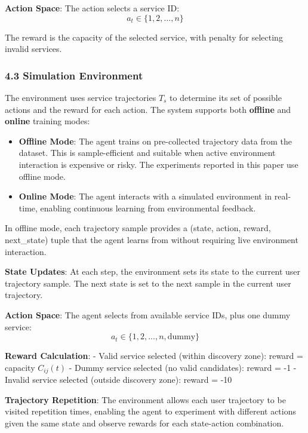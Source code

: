\documentclass[
  10pt,
  twocolumn,
]{article}
\begin{document}
\textbf{Action Space}: The action selects a service ID:
\[a_t \in \{1, 2, ..., n\}\]

The reward is the capacity of the selected service, with penalty for
selecting invalid services.

\hypertarget{simulation-environment}{%
	\subsubsection{4.3 Simulation
		Environment}\label{simulation-environment}}

The environment uses service trajectories \(T_s\) to determine its set
of possible actions and the reward for each action. The system supports
both \textbf{offline} and \textbf{online} training modes:

\begin{itemize}
	\item
	      \textbf{Offline Mode}: The agent trains on pre-collected trajectory
	      data from the dataset. This is sample-efficient and suitable when
	      active environment interaction is expensive or risky. The experiments
	      reported in this paper use offline mode.
	\item
	      \textbf{Online Mode}: The agent interacts with a simulated environment
	      in real-time, enabling continuous learning from environmental
	      feedback.
\end{itemize}

In offline mode, each trajectory sample provides a (state, action,
reward, next\_state) tuple that the agent learns from without requiring
live environment interaction.

\textbf{State Updates}: At each step, the environment sets its state to
the current user trajectory sample. The next state is set to the next
sample in the current user trajectory.

\textbf{Action Space}: The agent selects from available service IDs,
plus one dummy service: \[a_t \in \{1, 2, ..., n, \text{dummy}\}\]

\textbf{Reward Calculation}: - Valid service selected (within discovery
zone): reward = capacity \(C_{ij}(t)\) - Dummy service selected (no
valid candidates): reward = -1 - Invalid service selected (outside
discovery zone): reward = -10

\textbf{Trajectory Repetition}: The environment allows each user
trajectory to be visited repetition times, enabling the agent to
experiment with different actions given the same state and observe
rewards for each state-action combination.
\end{document}
